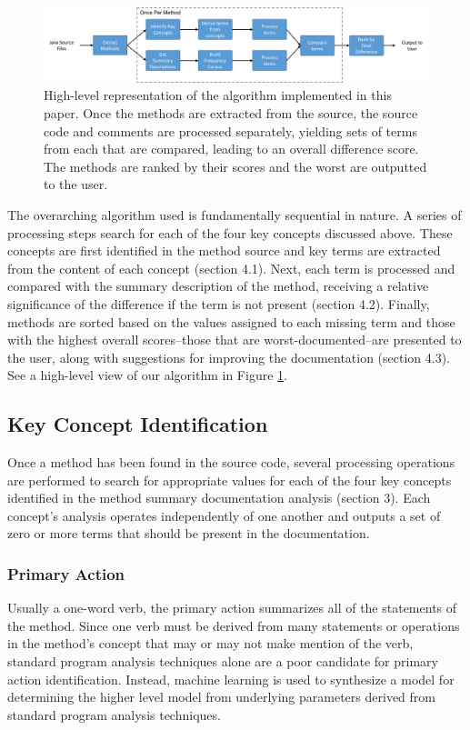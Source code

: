 \documentclass[preprint]{sigplanconf}
\begin{document}
\begin{figure}
	\begin{center}
		\includegraphics[width=\linewidth]{algorithm-structure.png}
	\end{center}
	\caption{High-level representation of the algorithm implemented in this paper. Once the methods are extracted from the source, the source code and comments are processed separately, yielding sets of terms from each that are compared, leading to an overall difference score. The methods are ranked by their scores and the worst are outputted to the user.}
	\label{figure-algorithm-summary}
\end{figure}

The overarching algorithm used is fundamentally sequential in nature. A series of processing steps search for each of the four key concepts discussed above. These concepts are first identified in the method source and key terms are extracted from the content of each concept (section 4.1). Next, each term is processed and compared with the summary description of the method, receiving a relative significance of the difference if the term is not present (section 4.2). Finally, methods are sorted based on the values assigned to each missing term and those with the highest overall scores--those that are worst-documented--are presented to the user, along with suggestions for improving the documentation (section 4.3). See a high-level view of our algorithm in Figure \ref{figure-algorithm-summary}.

\subsection{Key Concept Identification}
Once a method has been found in the source code, several processing operations are performed to search for appropriate values for each of the four key concepts identified in the method summary documentation analysis (section 3). Each concept's analysis operates independently of one another and outputs a set of zero or more terms that should be present in the documentation.

\subsubsection{Primary Action}
Usually a one-word verb, the primary action summarizes all of the statements of the method. Since one verb must be derived from many statements or operations in the method's concept that may or may not make mention of the verb, standard program analysis techniques alone are a poor candidate for primary action identification. Instead, machine learning is used to synthesize a model for determining the higher level model from underlying parameters derived from standard program analysis techniques.
\end{document}

